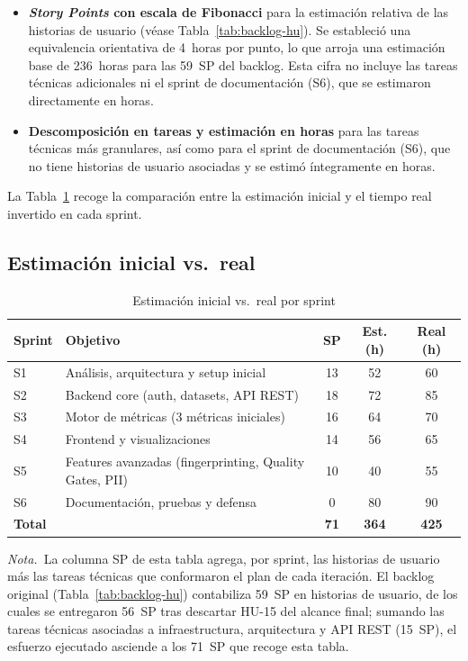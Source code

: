 \begin{itemize}
  \item \textbf{\emph{Story Points} con escala de Fibonacci} para la
    estimación relativa de las historias de usuario (véase
    Tabla~\ref{tab:backlog-hu}).  Se estableció una equivalencia
    orientativa de 4~horas por punto, lo que arroja una estimación
    base de 236~horas para las 59~\ac{SP} del backlog.  Esta cifra no
    incluye las tareas técnicas adicionales ni el sprint de
    documentación (S6), que se estimaron directamente en horas.

  \item \textbf{Descomposición en tareas y estimación en horas} para
    las tareas técnicas más granulares, así como para el sprint de
    documentación (S6), que no tiene historias de usuario asociadas y
    se estimó íntegramente en horas.
\end{itemize}

La Tabla~\ref{tab:estimacion-sprints} recoge la comparación entre la
estimación inicial y el tiempo real invertido en cada sprint.

\subsection{Estimación inicial vs.\ real}

\begin{table}[htbp]
  \centering
  \caption{Estimación inicial vs.\ real por sprint}
  \label{tab:estimacion-sprints}
  \begin{tabularx}{\textwidth}{l X c c c}
    \toprule
    \textbf{Sprint} & \textbf{Objetivo} &
      \textbf{SP} & \textbf{Est. (h)} & \textbf{Real (h)} \\
    \midrule
    S1 & Análisis, arquitectura y setup inicial  & 13 &  52 &  60 \\
    S2 & Backend core (auth, datasets, API \ac{REST}) & 18 &  72 &  85 \\
    S3 & Motor de métricas (3 métricas iniciales) & 16 &  64 &  70 \\
    S4 & Frontend y visualizaciones              & 14 &  56 &  65 \\
    S5 & Features avanzadas (fingerprinting, Quality Gates, \ac{PII}) & 10 & 40 & 55 \\
    S6 & Documentación, pruebas y defensa        &  0 &  80 &  90 \\
    \midrule
    \textbf{Total} & & \textbf{71} & \textbf{364} & \textbf{425} \\
    \bottomrule
  \end{tabularx}
  \medskip\par\footnotesize\raggedright
  \textit{Nota.}~La columna \ac{SP} de esta tabla agrega, por sprint, las
  historias de usuario más las tareas técnicas que conformaron el plan
  de cada iteración. El backlog original
  (Tabla~\ref{tab:backlog-hu}) contabiliza 59~\ac{SP} en historias de
  usuario, de los cuales se entregaron 56~\ac{SP} tras descartar HU-15 del
  alcance final; sumando las tareas técnicas asociadas a infraestructura,
  arquitectura y \ac{API} \ac{REST} (15~\ac{SP}), el esfuerzo ejecutado
  asciende a los 71~\ac{SP} que recoge esta tabla.
\end{table}

